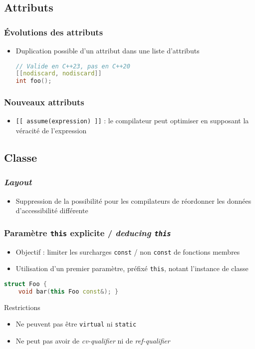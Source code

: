 \documentclass[C++.tex]{subfiles}
\begin{document}
\subsection*{Attributs}
\begin{frame}[fragile]
	\frametitle{Évolutions des attributs}
	\begin{itemize}
		\item Duplication possible d'un attribut dans une liste d'attributs

		\begin{lstlisting}[language=C++]
// Valide en C++23, pas en C++20
[[nodiscard, nodiscard]]
int foo();\end{lstlisting}
	\end{itemize}
\end{frame}

\begin{frame}[fragile]
	\frametitle{Nouveaux attributs}
	\begin{itemize}
		\item \lstinline|[[ assume(expression) ]]| : le compilateur peut optimiser en supposant la véracité de l'expression
	\end{itemize}
\end{frame}

\subsection*{Classe}
\begin{frame}[fragile]
	\frametitle{\textit{Layout}}
	\begin{itemize}
		\item Suppression de la possibilité pour les compilateurs de réordonner les données d'accessibilité différente
	\end{itemize}
\end{frame}

\begin{frame}[fragile]
	\frametitle{Paramètre \lstinline|this| explicite / \textit{deducing \lstinline|this|}}
	\begin{itemize}
		\item Objectif : limiter les surcharges \lstinline|const| / non \lstinline|const| de fonctions membres
		\item Utilisation d'un premier paramètre, préfixé \lstinline|this|, notant l'instance de classe
	\end{itemize}

	\begin{lstlisting}[language=C++]
struct Foo {
	void bar(this Foo const&); }\end{lstlisting}

	\begin{alertblock}{Restrictions}
		\begin{itemize}
			\item Ne peuvent pas être \lstinline|virtual| ni \lstinline|static|
			\item Ne peut pas avoir de \textit{cv-qualifier} ni de \textit{ref-qualifier}
		\end{itemize}
	\end{alertblock}
\end{frame}
\end{document}
